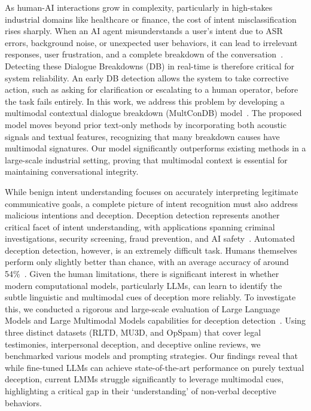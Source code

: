 As human-AI interactions grow in complexity, particularly in high-stakes industrial domains like healthcare or finance, the cost of intent misclassification rises sharply. When an AI agent misunderstands a user's intent due to ASR errors, background noise, or unexpected user behaviors, it can lead to irrelevant responses, user frustration, and a complete breakdown of the conversation~\cite{higashinaka-etal-2016-dialogue}. Detecting these Dialogue Breakdowns (DB) in real-time is therefore critical for system reliability. An early DB detection allows the system to take corrective action, such as asking for clarification or escalating to a human operator, before the task fails entirely. In this work, we address this problem by developing a multimodal contextual dialogue breakdown (MultConDB) model~\cite{MiahDB}. The proposed model moves beyond prior text-only methods by incorporating both acoustic signals and textual features, recognizing that many breakdown causes have multimodal signatures. Our model significantly outperforms existing methods in a large-scale industrial setting, proving that multimodal context is essential for maintaining conversational integrity.

While benign intent understanding focuses on accurately interpreting legitimate communicative goals, a complete picture of intent recognition must also address malicious intentions and deception. Deception detection represents another critical facet of intent understanding, with applications spanning criminal investigations, security screening, fraud prevention, and AI safety~\cite{depaulo-54, vrij2008detecting}. Automated deception detection, however, is an extremely difficult task. Humans themselves perform only slightly better than chance, with an average accuracy of around 54\%~\cite{depaulo-54}. Given the human limitations, there is significant interest in whether modern computational models, particularly LLMs, can learn to identify the subtle linguistic and multimodal cues of deception more reliably. To investigate this, we conducted a rigorous and large-scale evaluation of Large Language Models and Large Multimodal Models capabilities for deception detection~\cite{MiahDC}. Using three distinct datasets (RLTD, MU3D, and OpSpam) that cover legal testimonies, interpersonal deception, and deceptive online reviews, we benchmarked various models and prompting strategies. Our findings reveal that while fine-tuned LLMs can achieve state-of-the-art performance on purely textual deception, current LMMs struggle significantly to leverage multimodal cues, highlighting a critical gap in their `understanding' of non-verbal deceptive behaviors.

